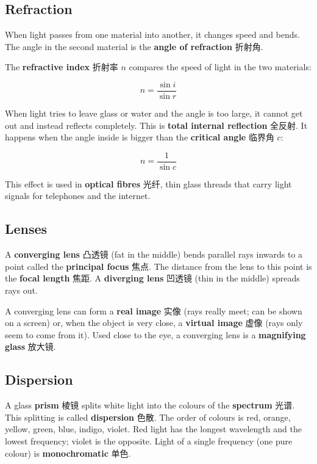 \documentclass[11pt]{article}
\begin{document}
\subsection*{Refraction}

When light passes from one material into another, it changes speed and bends. The angle in the second material is the \textbf{angle of refraction} 折射角.

The \textbf{refractive index} 折射率 $n$ compares the speed of light in the two materials:

\[
n = \frac{\sin i}{\sin r}
\]

When light tries to leave glass or water and the angle is too large, it cannot get out and instead reflects completely. This is \textbf{total internal reflection} 全反射. It happens when the angle inside is bigger than the \textbf{critical angle} 临界角 $c$:

\[
n = \frac{1}{\sin c}
\]

This effect is used in \textbf{optical fibres} 光纤, thin glass threads that carry light signals for telephones and the internet.

\subsection*{Lenses}

A \textbf{converging lens} 凸透镜 (fat in the middle) bends parallel rays inwards to a point called the \textbf{principal focus} 焦点. The distance from the lens to this point is the \textbf{focal length} 焦距. A \textbf{diverging lens} 凹透镜 (thin in the middle) spreads rays out.

A converging lens can form a \textbf{real image} 实像 (rays really meet; can be shown on a screen) or, when the object is very close, a \textbf{virtual image} 虚像 (rays only seem to come from it). Used close to the eye, a converging lens is a \textbf{magnifying glass} 放大镜.

\subsection*{Dispersion}

A glass \textbf{prism} 棱镜 splits white light into the colours of the \textbf{spectrum} 光谱. This splitting is called \textbf{dispersion} 色散. The order of colours is red, orange, yellow, green, blue, indigo, violet. Red light has the longest wavelength and the lowest frequency; violet is the opposite. Light of a single frequency (one pure colour) is \textbf{monochromatic} 单色.
\end{document}
